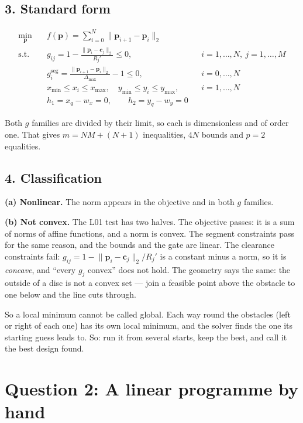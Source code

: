\documentclass[11pt,a4paper]{article}
\begin{document}
\subsection*{3. Standard form}

\begin{align}
  \min_{\bm{p}} \quad & f(\bm{p}) = \sum_{i=0}^{N} \lVert \bm{p}_{i+1} - \bm{p}_i \rVert_2 \\[0.4em]
  \text{s.t.} \quad
  & g_{ij} = 1 - \frac{\lVert \bm{p}_i - \bm{c}_j \rVert_2}{R_j'} \le 0,
    && i = 1,\dots,N,\ j = 1,\dots,M \\[0.4em]
  & g_i^{\mathrm{seg}} = \frac{\lVert \bm{p}_{i+1} - \bm{p}_i \rVert_2}{\Delta_{\max}} - 1 \le 0,
    && i = 0,\dots,N \\[0.4em]
  & x_{\min} \le x_i \le x_{\max}, \quad y_{\min} \le y_i \le y_{\max},
    && i = 1,\dots,N \\[0.4em]
  & h_1 = x_q - w_x = 0, \qquad h_2 = y_q - w_y = 0
\end{align}

Both $g$ families are divided by their limit, so each is dimensionless and of
order one. That gives $m = NM + (N+1)$ inequalities, $4N$ bounds and $p = 2$
equalities.

\subsection*{4. Classification}

\textbf{(a) Nonlinear.} The norm appears in the objective and in both $g$
families.

\textbf{(b) Not convex.} The L01 test has two halves. The objective passes: it
is a sum of norms of affine functions, and a norm is convex. The segment
constraints pass for the same reason, and the bounds and the gate are linear.
The clearance constraints fail: $g_{ij} = 1 - \lVert \bm{p}_i - \bm{c}_j
\rVert_2 / R_j'$ is a constant minus a norm, so it is \emph{concave}, and
``every $g_j$ convex'' does not hold. The geometry says the same: the outside of
a disc is not a convex set --- join a feasible point above the obstacle to one
below and the line cuts through.

So a local minimum cannot be called global. Each way round the obstacles (left
or right of each one) has its own local minimum, and the solver finds the one
its starting guess leads to. So: run it from several starts, keep the best, and
call it the best design found.

\newpage
\section*{Question 2: A linear programme by hand}
\end{document}
